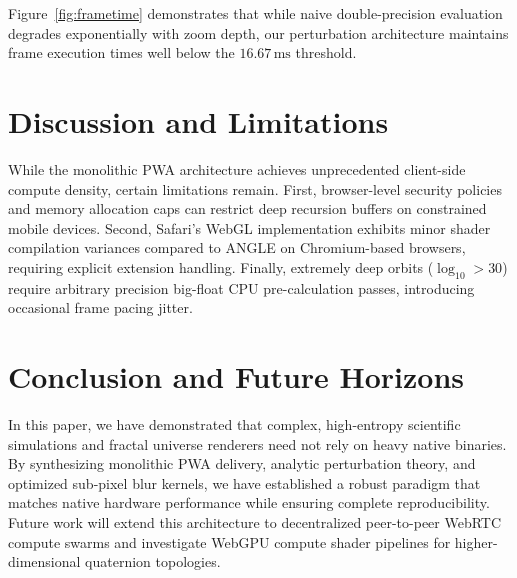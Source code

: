 \documentclass[10pt,journal,compsoc]{IEEEtran}
\begin{document}
Figure~\ref{fig:frametime} demonstrates that while naive double-precision evaluation degrades exponentially with zoom depth, our perturbation architecture maintains frame execution times well below the $16.67\,\text{ms}$ threshold.

\section{Discussion and Limitations}
While the monolithic PWA architecture achieves unprecedented client-side compute density, certain limitations remain. First, browser-level security policies and memory allocation caps can restrict deep recursion buffers on constrained mobile devices. Second, Safari's WebGL implementation exhibits minor shader compilation variances compared to ANGLE on Chromium-based browsers, requiring explicit extension handling. Finally, extremely deep orbits ($\log_{10} > 30$) require arbitrary precision big-float CPU pre-calculation passes, introducing occasional frame pacing jitter.

\section{Conclusion and Future Horizons}
In this paper, we have demonstrated that complex, high-entropy scientific simulations and fractal universe renderers need not rely on heavy native binaries. By synthesizing monolithic PWA delivery, analytic perturbation theory, and optimized sub-pixel blur kernels, we have established a robust paradigm that matches native hardware performance while ensuring complete reproducibility. Future work will extend this architecture to decentralized peer-to-peer WebRTC compute swarms and investigate WebGPU compute shader pipelines for higher-dimensional quaternion topologies.
\end{document}
